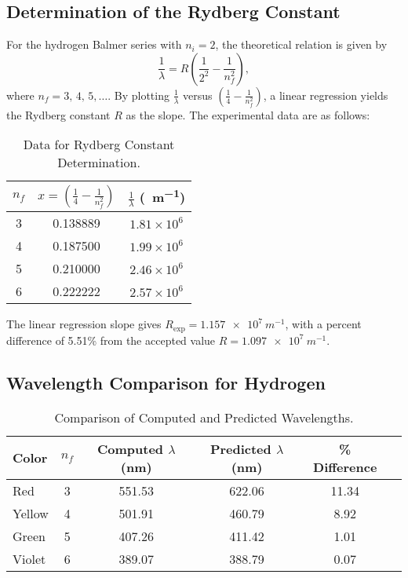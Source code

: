 \documentclass[12pt]{article}
\begin{document}
\subsection{Determination of the Rydberg Constant}
For the hydrogen Balmer series with \(n_i = 2\), the theoretical relation is given by
\[
\frac{1}{\lambda} = R \left(\frac{1}{2^2} - \frac{1}{n_f^2}\right),
\]
where \(n_f = 3,\,4,\,5,\dots\). By plotting \(\frac{1}{\lambda}\) versus \(\left(\frac{1}{4}-\frac{1}{n_f^2}\right)\), a linear regression yields the Rydberg constant \(R\) as the slope. The experimental data are as follows:

\begin{table}[H]
  \centering
  \caption{Data for Rydberg Constant Determination.}
  \begin{tabular}{ccc}
    \toprule
    \(n_f\) & \(x = \left(\frac{1}{4} - \frac{1}{n_f^2}\right)\) & \(\frac{1}{\lambda}\) (\SI{}{m^{-1}}) \\
    \midrule
    3 & 0.138889 & \(1.81 \times 10^6\) \\
    4 & 0.187500 & \(1.99 \times 10^6\) \\
    5 & 0.210000 & \(2.46 \times 10^6\) \\
    6 & 0.222222 & \(2.57 \times 10^6\) \\
    \bottomrule
  \end{tabular}
  \label{tab:rydberg_data}
\end{table}

The linear regression slope gives \(R_{\text{exp}} = \SI{1.157e7}{m^{-1}}\), with a percent difference of 5.51\% from the accepted value \(R = \SI{1.097e7}{m^{-1}}\).

\subsection{Wavelength Comparison for Hydrogen}
\begin{table}[H]
  \centering
  \caption{Comparison of Computed and Predicted Wavelengths.}
  \begin{tabular}{lccccc}
    \toprule
    Color   & \(n_f\) & Computed \(\lambda\) (nm) & Predicted \(\lambda\) (nm) & \% Difference \\
    \midrule
    Red     & 3 & 551.53 & 622.06 & 11.34 \\
    Yellow  & 4 & 501.91 & 460.79 & 8.92 \\
    Green   & 5 & 407.26 & 411.42 & 1.01 \\
    Violet  & 6 & 389.07 & 388.79 & 0.07 \\
    \bottomrule
  \end{tabular}
  \label{tab:comparison}
\end{table}
\end{document}
